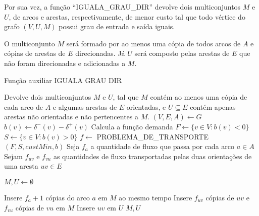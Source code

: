     Por sua vez, a função ``IGUALA\_GRAU\_DIR'' devolve dois multiconjuntos $M$ e $U$, de arcos e arestas, respectivamente, de menor custo tal que todo vértice do grafo $(V, U, M)$ possui grau de entrada e saída iguais.

    O multiconjunto $M$ será formado por ao menos uma cópia de todos arcos de $A$ e cópias de arestas de $E$ direcionadas.
    Já $U$ será composto pelas arestas de $E$ que não foram direcionadas e adicionadas a $M$.

    \begin{algorithm}
    \caption{Função auxiliar IGUALA GRAU DIR}
    \label{mixed-iguala-grau-dir}
    \begin{algorithmic}[1]
    \State \Comment Devolve dois multiconjuntos $M$ e $U$, tal que $M$ contém ao menos uma cópia de cada arco de $A$ e algumas arestas de $E$ orientadas, e $U \subseteq E$ contém apenas arestas não orientadas e não pertencentes a $M$.
        \State $(V, E, A) \gets G$
            \State $b(v) \gets \delta^-(v) - \delta^+(v)$ \Comment Calcula a função demanda
        \EndFor
        \State $F \gets \{v \in V : b(v) < 0\}$
        \State $S \gets \{v \in V : b(v) > 0\}$
        \State $f \gets $ PROBLEMA\_DE\_TRANSPORTE$(F, S, custMin, b)$
        \State Seja $f_a$ a quantidade de fluxo que passa por cada arco $a \in A$ 
        \State Sejam $f_{uv}$ e $f_{vu}$ as quantidades de fluxo transportadas pelas duas orientações de uma aresta $uv \in E$

        \State $M, U \gets \emptyset$

            \State Insere $f_a + 1$ cópias do arco $a$ em $M$
        \EndFor
              ao mesmo tempo %
                \State Insere $f_{uv}$ cópias de $uv$ e $f_{vu}$ cópias de $vu$ em $M$
            \Else 
                \State Insere $uv$ em $U$ 
            \EndIf
        \EndFor
        \State \Return $M, U$
    \EndFunction
    \end{algorithmic}
    \end{algorithm}

